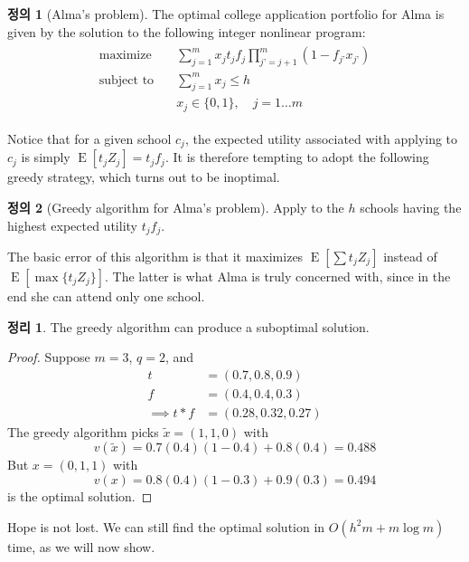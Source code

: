 \documentclass[12pt]{article} %
\newtheorem{theorem}{Theorem}
\theoremstyle{definition}
\newtheorem{definition}{Definition}
\newtheorem{theorem}{정리}
\theoremstyle{definition}
\newtheorem{definition}{정의}
\begin{document}
\begin{definition}[Alma’s problem]
The optimal college application portfolio for Alma is given by the solution to the following integer nonlinear program:
\begin{align}
\begin{split}
\text{maximize}\quad & \sum_{j=1}^m x_j t_j f_j \prod_{j’ = j+1}^m (1 - f_{j’} x_{j’}) \\
\text{subject to}\quad & \sum_{j=1}^m x_j \leq h \\
&x_j \in \{0, 1\}, \quad j = 1\dots m
\end{split}
\end{align}
\end{definition}
Notice that for a given school $c_j$, the expected utility associated with applying to $c_j$ is simply $\operatorname{E}[t_j Z_j] = t_j f_j$. It is therefore tempting to adopt the following greedy strategy, which turns out to be inoptimal.
\begin{definition}[Greedy algorithm for Alma’s problem]
Apply to the $h$ schools having the highest expected utility $t_j f_j$.
\end{definition}
The basic error of this algorithm is that it maximizes $\operatorname{E}\left[\sum t_j Z_j \right]$ instead of $\operatorname{E}\left[\max \{t_j Z_j\} \right]$. The latter is what Alma is truly concerned with, since in the end she can attend only one school.
\begin{theorem}
The greedy algorithm can produce a suboptimal solution.
\end{theorem}
\begin{proof}
Suppose $m=3$, $q=2$, and
\begin{align*}
t &= (0.7, 0.8, 0.9) \\
f &= (0.4, 0.4, 0.3) \\
\implies t * f &= (0.28, 0.32, 0.27)
\end{align*}
The greedy algorithm picks $\tilde x = (1, 1, 0)$ with 
\[v(\tilde x) = 0.7(0.4)(1-0.4) + 0.8(0.4) = 0.488\]
But $x = (0 , 1, 1)$ with
\[v(x) = 0.8(0.4)(1-0.3) + 0.9(0.3) = 0.494\]
is the optimal solution.
\end{proof}
Hope is not lost. We can still find the optimal solution in $O(h^2 m + m\log m)$ time, as we will now show.
\end{document}
